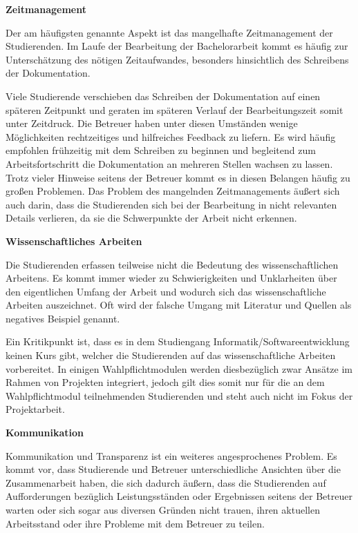 \documentclass[bibliography=totoc,listof=totoc,BCOR=5mm,DIV=12,oneside]{scrbook}
\begin{document}
\par \bigskip \textbf{Zeitmanagement}
\par Der am häufigsten genannte Aspekt ist das mangelhafte Zeitmanagement der Studierenden. Im Laufe der Bearbeitung der Bachelorarbeit kommt es häufig zur Unterschätzung des nötigen  Zeitaufwandes, besonders hinsichtlich des Schreibens der Dokumentation. 
\par Viele Studierende verschieben das Schreiben der Dokumentation auf einen späteren Zeitpunkt und geraten im späteren Verlauf der Bearbeitungszeit somit unter Zeitdruck. Die Betreuer haben unter diesen Umständen wenige Möglichkeiten rechtzeitiges und hilfreiches Feedback zu liefern. Es wird häufig empfohlen frühzeitig mit dem Schreiben zu beginnen und begleitend zum Arbeitsfortschritt die Dokumentation an mehreren Stellen wachsen zu lassen. Trotz vieler Hinweise seitens der Betreuer kommt es in diesen Belangen häufig zu großen Problemen.
Das Problem des mangelnden Zeitmanagements äußert sich auch darin, dass die Studierenden sich bei der Bearbeitung in nicht relevanten Details verlieren, da sie die Schwerpunkte der Arbeit nicht erkennen.
\par \bigskip \textbf{Wissenschaftliches Arbeiten}
\par Die Studierenden erfassen teilweise nicht die Bedeutung des wissenschaftlichen Arbeitens. Es kommt immer wieder zu Schwierigkeiten und Unklarheiten über den eigentlichen Umfang der Arbeit und wodurch sich das wissenschaftliche Arbeiten auszeichnet. Oft wird der falsche Umgang mit Literatur und Quellen als negatives Beispiel genannt.
\par Ein Kritikpunkt ist, dass es in dem Studiengang Informatik/Softwareentwicklung keinen Kurs gibt, welcher die Studierenden auf das wissenschaftliche Arbeiten vorbereitet. In einigen Wahlpflichtmodulen werden diesbezüglich zwar Ansätze im Rahmen von Projekten integriert, jedoch gilt dies somit nur für die an dem Wahlpflichtmodul teilnehmenden Studierenden und steht auch nicht im Fokus der Projektarbeit.
\par \bigskip \textbf{Kommunikation}
\par Kommunikation und Transparenz ist ein weiteres angesprochenes Problem. Es kommt vor, dass Studierende und Betreuer unterschiedliche Ansichten über die Zusammenarbeit haben, die sich dadurch äußern, dass die Studierenden auf Aufforderungen bezüglich Leistungsständen oder Ergebnissen seitens der Betreuer warten oder sich sogar aus diversen Gründen nicht trauen, ihren aktuellen Arbeitsstand oder ihre Probleme mit dem Betreuer zu teilen. 
\end{document}

